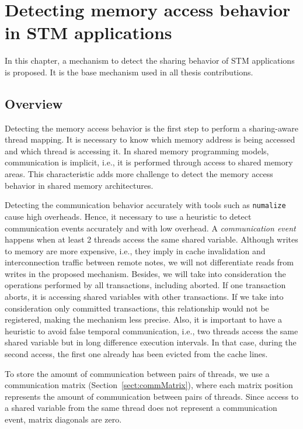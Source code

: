 \chapter{Detecting memory access behavior in STM applications}\label{chap:mechanism}

In this chapter, a mechanism to detect the sharing behavior of STM applications is proposed. It is the base mechanism used in all thesis contributions.

\section{Overview}

Detecting the memory access behavior is the first step to perform a sharing-aware thread mapping. It is necessary to know which memory address is being accessed and which thread is accessing it. In shared memory programming models, communication is implicit, i.e., it is performed through access to shared memory areas. This characteristic adds more challenge to detect the memory access behavior in shared memory architectures.

Detecting the communication behavior accurately with tools such as \texttt{numalize}~\cite{Diener2015} cause high overheads. Hence, it necessary to use a heuristic to detect communication events accurately and with low overhead. A \emph{communication event} happens when at least 2 threads access the same shared variable. Although writes to memory are more expensive, i.e., they imply in cache invalidation and interconnection traffic between remote notes, we will not differentiate reads from writes in the proposed mechanism. Besides, we will take into consideration the operations performed by all transactions, including aborted. If one transaction aborts, it is accessing shared variables with other transactions. If we take into consideration only committed transactions, this relationship would not be registered, making the mechanism less precise. Also, it is important to have a heuristic to avoid false temporal communication, i.e., two threads access the same shared variable but in long difference execution intervals. In that case, during the second access, the first one already has been evicted from the cache lines.

To store the amount of communication between pairs of threads, we use a communication matrix (Section~\ref{sect:commMatrix}), where each matrix position represents the amount of communication between pairs of threads. Since access to a shared variable from the same thread does not represent a communication event, matrix diagonals are zero.

